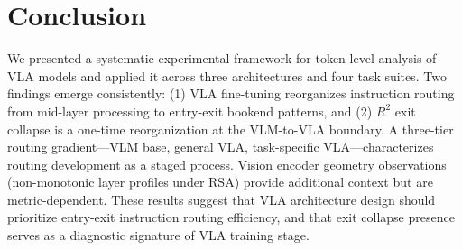 \documentclass[10pt,letterpaper]{article}
\begin{document}
\section{Conclusion}
\label{sec:conclusion}

We presented a systematic experimental framework for token-level analysis of VLA models and applied it across three architectures and four task suites. Two findings emerge consistently: (1) VLA fine-tuning reorganizes instruction routing from mid-layer processing to entry-exit bookend patterns, and (2) $R^2$ exit collapse is a one-time reorganization at the VLM-to-VLA boundary. A three-tier routing gradient---VLM base, general VLA, task-specific VLA---characterizes routing development as a staged process. Vision encoder geometry observations (non-monotonic layer profiles under RSA) provide additional context but are metric-dependent. These results suggest that VLA architecture design should prioritize entry-exit instruction routing efficiency, and that exit collapse presence serves as a diagnostic signature of VLA training stage.



\end{document}
